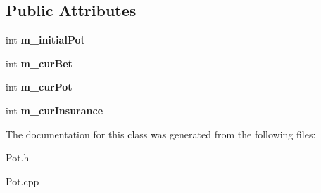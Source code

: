 \subsection*{Public Attributes}
\begin{DoxyCompactItemize}
\item 
int {\bfseries m\+\_\+initial\+Pot}\hypertarget{class_pot_ac83f0f8076ae4581017b04acedb15162}{}\label{class_pot_ac83f0f8076ae4581017b04acedb15162}

\item 
int {\bfseries m\+\_\+cur\+Bet}\hypertarget{class_pot_a9387b52aafa588830e58056efb1df365}{}\label{class_pot_a9387b52aafa588830e58056efb1df365}

\item 
int {\bfseries m\+\_\+cur\+Pot}\hypertarget{class_pot_a3c53359bce49d08ad42378a40223ec76}{}\label{class_pot_a3c53359bce49d08ad42378a40223ec76}

\item 
int {\bfseries m\+\_\+cur\+Insurance}\hypertarget{class_pot_adc1c1fcd3be66dadeab0633fdbde460c}{}\label{class_pot_adc1c1fcd3be66dadeab0633fdbde460c}

\end{DoxyCompactItemize}


The documentation for this class was generated from the following files\+:\begin{DoxyCompactItemize}
\item 
Pot.\+h\item 
Pot.\+cpp\end{DoxyCompactItemize}
